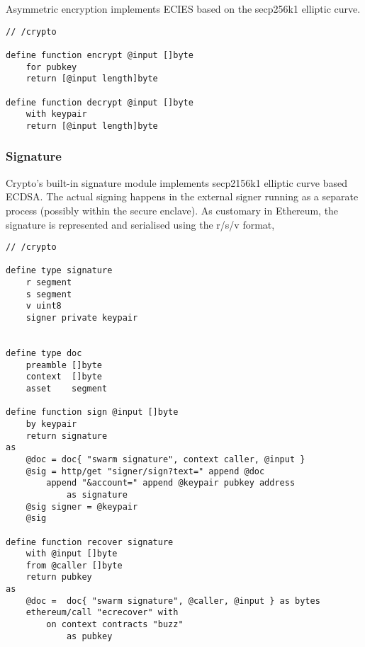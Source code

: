 Asymmetric encryption implements ECIES based on  the secp256k1 elliptic curve. 

\begin{definition}\label{def:asymmetric-encryption}
\begin{lstlisting}[language=buzz1]
// /crypto

define function encrypt @input []byte 
    for pubkey
    return [@input length]byte

define function decrypt @input []byte 
    with keypair
    return [@input length]byte

\end{lstlisting}
\end{definition}  


\subsubsection{Signature}

Crypto's  built-in signature module implements secp2156k1 elliptic curve based ECDSA. The actual signing happens in the external signer running as a separate process (possibly within the secure enclave). As  customary  in Ethereum, the  signature is represented and serialised using the r/s/v format,

\begin{definition}[Signature]\label{def:signature}
\begin{lstlisting}[language=buzz1]
// /crypto

define type signature
    r segment
    s segment
    v uint8
    signer private keypair
    

define type doc 
    preamble []byte
    context  []byte
    asset    segment
    
define function sign @input []byte 
    by keypair
    return signature
as
    @doc = doc{ "swarm signature", context caller, @input }
    @sig = http/get "signer/sign?text=" append @doc 
        append "&account=" append @keypair pubkey address
            as signature 
    @sig signer = @keypair
    @sig
    
define function recover signature
    with @input []byte
    from @caller []byte
    return pubkey
as
    @doc =  doc{ "swarm signature", @caller, @input } as bytes
    ethereum/call "ecrecover" with 
        on context contracts "buzz" 
            as pubkey

\end{lstlisting}
\end{definition}  


